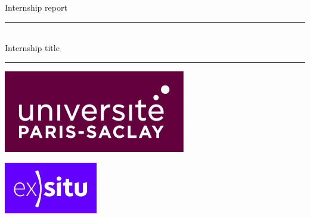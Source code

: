 \begin{code}
    \begin{gridlayout}{\textwidth}{15cm}
        \begin{row}{0.1}
            \begin{cell}{1}
                \centering
                Internship report
            \end{cell}
        \end{row}
        \begin{row}{0.1}
            \begin{cell}{1}
            \end{cell}
        \end{row}
        \begin{row}{0.1}
            \begin{cell}{1}
                \centering
                \rule{0.6\cellwidth}{0.4pt}\\[1.5ex]
                {\Large Internship title}\\
                \rule{0.6\cellwidth}{0.4pt}
            \end{cell}
        \end{row}
        \begin{row}{0.45}
            \begin{cell}{1}
            \end{cell}
        \end{row}
        \begin{row}{0.25}
            \begin{cell}{0.5}
                \centering
                \includegraphics[width=\cellwidth]{doc-one/img/logo-univ-ps.png}
            \end{cell}
            \begin{cell}{0.5}
                \centering
                \includegraphics[width=\cellwidth]{doc-one/img/logo-ex-situ.png}
            \end{cell}
        \end{row}
    \end{gridlayout}
\logoguidesofdoctwo
\end{code}

\newpage
